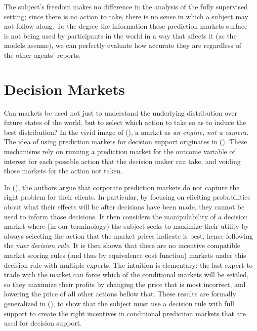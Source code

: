 The subject's freedom makes no difference in the analysis of the fully supervised setting; since there is no action to take, there is no sense in which a subject may not follow along. To the degree the information these prediction markets surface is not being used by participants in the world in a way that affects it (as the models assume), we can perfectly evaluate how accurate they are regardless of the other agents' reports.


\section{Decision Markets}

Can markets be used not just to understand the underlying distribution over future states of the world, but to select which action to take so as to induce the best distribution? In the vivid image of (\cite{mackenzie2008engine}), a market as \emph{an engine, not a camera}. %
The idea of using prediction markets for decision support originates in (\cite{berg2003prediction,hanson2002decision}). 
These mechanisms rely on running a prediction market for the outcome variable of interest for each possible action that the decision maker can take, and voiding those markets for the action not taken.

In (\cite{othman2010decision}), the authors argue that corporate prediction markets do not capture the right problem for their clients. In particular, by focusing on eliciting probabilities about what their effects will be after decisions have been made, they cannot be used to inform those decisions. It then considers the manipulability of a decision market where (in our terminology) the subject seeks to maximize their utility by always selecting the action that the market prices indicate is best, hence following the \emph{max decision rule}. It is then shown that there are no incentive compatible market scoring rules (and thus by equivalence cost function) markets under this decision rule with multiple experts. %
The intuition is elementary: the last expert to trade with the market can force which of the conditional markets will be settled, so they maximize their profits by changing the price that is most incorrect, and lowering the price of all other actions bellow that.
These results are formally generalized in (\cite{chen2014eliciting}), to show that the subject must use a decision rule with full support to create the right incentives in conditional prediction markets that are used for decision support.

